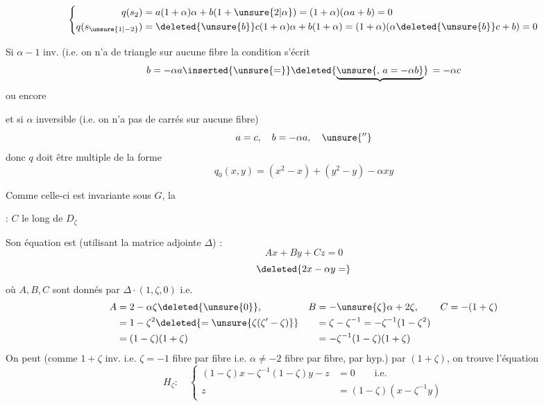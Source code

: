 \[
\left\{\begin{aligned}
q(s_2)&=a(1+\alpha)\alpha+b(1+\unsure{2|\alpha})=(1+\alpha)(\alpha a+b)=0\\
q(s_{\unsure{1|-2}})&=\deleted{\unsure{b}}c(1+\alpha)\alpha+b(1+\alpha)=(1+\alpha)(\alpha\deleted{\unsure{b}}c+b)=0
\end{aligned}\right.
\]

Si $\alpha-1$ inv. (i.e. on n'a de triangle sur aucune fibre
la condition s'écrit
\[
 b=-\alpha a\inserted{\unsure{=}}\deleted{\underbrace{\unsure{,\,a=-\alpha b}}}\,=-\alpha c
\]
ou encore

et si $\alpha$ inversible (i.e. on n'a pas de carrés sur aucune fibre)
\[
 a=c,\quad b=-\alpha a,\quad \unsure{''}
\]
donc $q$ doit être multiple  de la forme
\[
q_0(x,y)=(x^2-x)+(y^2-y)-\alpha xy \tag*{(2)}
\]

Comme celle-ci est invariante sous $G$, la



 : $C$ le long de $D_{\zeta}$

Son équation est (utilisant la matrice
adjointe  $\Delta$) :
\[
Ax+By+Cz=0
\]
\[
\deleted{2x-\alpha y=}
\]
où $A,B,C$ sont donnés par $\Delta\cdot(1,\zeta,0)$ i.e.
\[
\begin{aligned}
 A&=2-\alpha\zeta\deleted{\unsure{0}}, & B&=-\unsure{\zeta}\alpha+2\zeta, & C&=-(1+\zeta)\\
 &=1-\zeta^2\deleted{=\unsure{\zeta(\zeta'-\zeta)}}&&=\zeta-\zeta^{-1}=-\zeta^{-1}(1-\zeta^2)\\
 &=(1-\zeta)(1+\zeta)&&=-\zeta^{-1}(1-\zeta)(1+\zeta)
\end{aligned}
\]
On peut (comme $1+\zeta$  inv. i.e. $\zeta=-1$ fibre par
fibre i.e. $\alpha\ne-2$ fibre par fibre, par hyp.) 
par $(1+\zeta)$, on trouve l'équation
\[
H_\zeta:\quad\left\{\begin{aligned}
 (1-\zeta)x-\zeta^{-1}(1-\zeta)y-z&=0\qquad\text{i.e.}\\
 z&=(1-\zeta)(x-\zeta^{-1}y)
\end{aligned}\right.
\]

